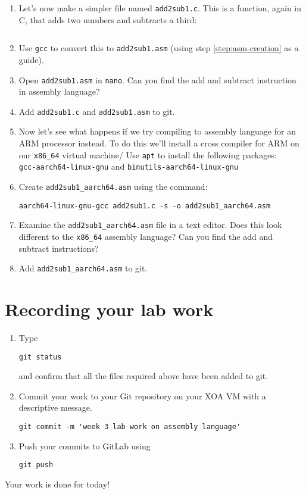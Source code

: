 \begin{enumerate}
\item
  Let's now make a simpler file named \texttt{add2sub1.c}.
  This is a function, again in C, that adds two numbers and subtracts a third:
  \inputminted{c}{add2sub1.c}

\item
  Use \texttt{gcc} to convert this to \texttt{add2sub1.asm} (using step \ref{step:asm-creation} as a guide).

\item
  Open \texttt{add2sub1.asm} in \texttt{nano}.
  Can you find the add and subtract instruction in assembly language?

\item
  Add \texttt{add2sub1.c} and \texttt{add2sub1.asm} to git.
  
\item
  Now let's see what happens if we try compiling to assembly language for an ARM processor instead.
  To do this we'll install a cross compiler for ARM on our \texttt{x86\_64} virtual machine/ 
  Use \texttt{apt} to install the following packages:\\
  \texttt{gcc-aarch64-linux-gnu} and \texttt{binutils-aarch64-linux-gnu}
  
\item 
  Create \texttt{add2sub1\_aarch64.asm} using the command:
\begin{verbatim}
aarch64-linux-gnu-gcc add2sub1.c -s -o add2sub1_aarch64.asm
\end{verbatim}

\item
  Examine the \texttt{add2sub1\_aarch64.asm} file in a text editor.
  Does this look different to the \texttt{x86\_64} assembly language?
  Can you find the add and subtract instructions?

\item
  Add \texttt{add2sub1\_aarch64.asm} to git.
  
\end{enumerate}

\section{Recording your lab work}

\begin{enumerate}
\item Type
\begin{verbatim}
git status
\end{verbatim}
  and confirm that all the files required above have been added to git.
\item
  Commit your work to your Git repository on your XOA VM with a descriptive message.
\begin{verbatim}
git commit -m 'week 3 lab work on assembly language'
\end{verbatim}
\item
  Push your commits to GitLab using
\begin{verbatim}
git push
\end{verbatim}
\end{enumerate}

Your work is done for today!

